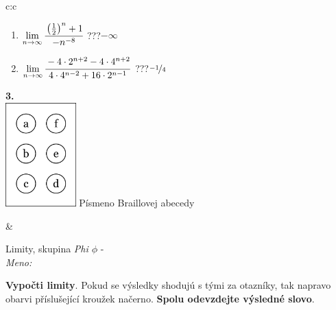 \documentclass[10pt]{report}
\begin{document}
\begin{tabular}{c:c}
\begin{minipage}[c][104.5mm][t]{0.5\linewidth}
\begin{center}
\begin{minipage}{0.79\linewidth}
\begin{center}
\begin{varwidth}{\linewidth}
\begin{enumerate}
\item $\lim\limits_{n\to\infty}\cfrac{\left(\frac{1}{2}\right)^n +1}{-n^{-8}}$\quad \dotfill\; ???\;\dotfill \quad $-\infty$
\item $\lim\limits_{n\to\infty}\cfrac{-4\cdot 2^{n+2}-4\cdot 4^{n+2}}{4\cdot 4^{n-2}+16\cdot 2^{n-1}}$\quad \dotfill\; ???\;\dotfill \quad $\nicefrac{-1}{4}$
\end{enumerate}
\end{varwidth}
\end{center}
\end{minipage}
\begin{minipage}{0.20\linewidth}
\begin{center}
{\Huge\bfseries 3.} \\[2mm]
\includegraphics[height=40mm]{../images/braille.png}
{\small Písmeno Braillovej abecedy}
\end{center}
\end{minipage}
\end{center}
\end{minipage}
&
\begin{minipage}[c][104.5mm][t]{0.5\linewidth}
\begin{center}
\vspace{7mm}
{\huge Limity, skupina \textit{Phi $\phi$} -}\\[5mm]
\textit{Meno:}\phantom{xxxxxxxxxxxxxxxxxxxxxxxxxxxxxxxxxxxxxxxxxxxxxxxxxxxxxxxxxxxxxxxxx}\\[5mm]
\begin{minipage}{0.95\linewidth}
\begin{center}
\textbf{Vypočti limity}. Pokud se výsledky shodujú s tými za otazníky, tak napravo\\obarvi příslušející kroužek načerno. \textbf{Spolu odevzdejte výsledné slovo}.
\end{center}
\end{minipage}
\\[1mm]
\begin{minipage}{0.79\linewidth}
\begin{center}
\begin{varwidth}{\linewidth}

\end{varwidth}
\end{center}
\end{minipage}
\end{center}
\end{minipage}
\end{tabular}
\end{document}

